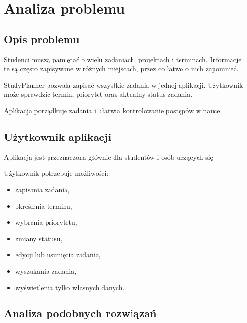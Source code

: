 \documentclass[12pt,a4paper]{article}
\begin{document}
\section{Analiza problemu}

\subsection{Opis problemu}

Studenci muszą pamiętać o wielu zadaniach, projektach i terminach. Informacje te są często zapisywane w różnych miejscach, przez co łatwo o nich zapomnieć.

StudyPlanner pozwala zapisać wszystkie zadania w jednej aplikacji. Użytkownik może sprawdzić termin, priorytet oraz aktualny status zadania.

Aplikacja porządkuje zadania i ułatwia kontrolowanie postępów w nauce.

\subsection{Użytkownik aplikacji}

Aplikacja jest przeznaczona głównie dla studentów i osób uczących się.

Użytkownik potrzebuje możliwości:

\begin{itemize}[leftmargin=*]
    \item zapisania zadania,
    \item określenia terminu,
    \item wybrania priorytetu,
    \item zmiany statusu,
    \item edycji lub usunięcia zadania,
    \item wyszukania zadania,
    \item wyświetlenia tylko własnych danych.
\end{itemize}

\subsection{Analiza podobnych rozwiązań}
\end{document}
